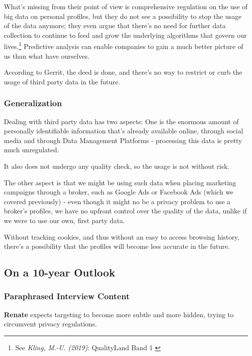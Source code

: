 What's missing from their point of view is comprehensive regulation on the use of big data on personal profiles, but they do not see a possibility to stop the usage of the data anymore; they even argue that there's no need for further data collection to continue to feed and grow the underlying algorithms that govern our lives.\footnote{See \textit{Kling, M.-U. (2019)}: QualityLand Band 1 \cite{qualityLand}} Predictive analysis can enable companies to gain a much better picture of us than what have ourselves.

According to Gerrit, the deed is done, and there's no way to restrict or curb the usage of third party data in the future.

\subsubsection{Generalization}

Dealing with third party data has two aspects: One is the enormous amount of personally identifiable information that's already available online, through social media and through Data Management Platforms - processing this data is pretty much unregulated. 

It also does not undergo any quality check, so the usage is not without risk.

The other aspect is that we might be using such data when placing marketing campaigns through a broker, such as Google Ads or Facebook Ads (which we covered previously) - even though it might no be a privacy problem to use a broker's profiles, we have no upfront control over the quality of the data, unlike if we were to use our own, first party data.

Without tracking cookies, and thus without an easy to access browsing history, there's a possibility that the profiles will become less accurate in the future.

\subsection{On a 10-year Outlook}

\subsubsection{Paraphrased Interview Content}

\textbf{Renate} expects targeting to become more subtle and more hidden, trying to circumvent privacy regulations.

